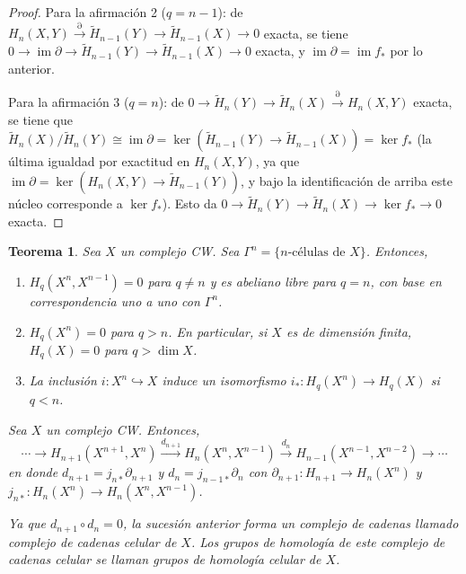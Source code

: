 \documentclass[11pt,a4paper]{article}
\theoremstyle{plain}
\newtheorem{theorem}{Teorema}[section]
\theoremstyle{definition}
\theoremstyle{remark}
\DeclareMathOperator{\im}{im}
\begin{document}
\begin{proof}
Para la afirmación 2 ($q=n-1$): de
$H_n(X,Y)\xrightarrow{\partial}\tilde H_{n-1}(Y)\to\tilde H_{n-1}(X)\to0$
exacta, se tiene $0\to\im\partial\to\tilde H_{n-1}(Y)\to\tilde H_{n-1}(X)\to0$
exacta, y $\im\partial=\im f_*$ por lo anterior.

Para la afirmación 3 ($q=n$): de
$0\to\tilde H_n(Y)\to\tilde H_n(X)\xrightarrow{\partial}H_n(X,Y)$ exacta,
se tiene que $\tilde H_n(X)/\tilde H_n(Y)\cong\im\partial=\ker(\tilde H_{n-1}(Y)\to\tilde H_{n-1}(X))=\ker f_*$
(la última igualdad por exactitud en $H_n(X,Y)$, ya que
$\im\partial=\ker(H_n(X,Y)\to\tilde H_{n-1}(Y))$, y bajo la identificación
de arriba este núcleo corresponde a $\ker f_*$). Esto da
$0\to\tilde H_n(Y)\to\tilde H_n(X)\to\ker f_*\to0$ exacta.
\end{proof}

\begin{theorem}
\label{thm:cw-celular}
Sea $X$ un complejo CW. Sea $\Gamma^n=\{n\text{-células de }X\}$. Entonces,
\begin{enumerate}[label=\arabic*.]
\item $H_q(X^n,X^{n-1})=0$ para $q\ne n$ y es abeliano libre para $q=n$,
con base en correspondencia uno a uno con $\Gamma^n$.
\item $H_q(X^n)=0$ para $q>n$. En particular, si $X$ es de dimensión
finita, $H_q(X)=0$ para $q>\dim X$.
\item La inclusión $i:X^n\hookrightarrow X$ induce un isomorfismo
$i_*:H_q(X^n)\to H_q(X)$ si $q<n$.
\end{enumerate}

Sea $X$ un complejo CW. Entonces,
\[
\cdots\to H_{n+1}(X^{n+1},X^n)\xrightarrow{d_{n+1}}H_n(X^n,X^{n-1})\xrightarrow{d_n}H_{n-1}(X^{n-1},X^{n-2})\to\cdots
\]
en donde $d_{n+1}=j_{n*}\partial_{n+1}$ y $d_n=j_{n-1*}\partial_n$ con
$\partial_{n+1}:H_{n+1}\to H_n(X^n)$ y
$j_{n*}:H_n(X^n)\to H_n(X^n,X^{n-1})$.

Ya que $d_{n+1}\circ d_n=0$, la sucesión anterior forma un complejo de
cadenas llamado \emph{complejo de cadenas celular} de $X$. Los grupos de
homología de este complejo de cadenas celular se llaman \emph{grupos de
homología celular} de $X$.
\end{theorem}
\end{document}
